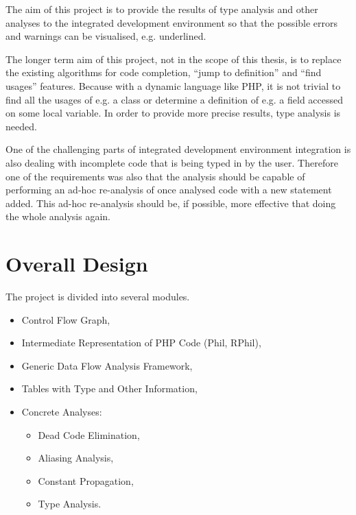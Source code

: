     The aim of this project is to provide the results of type analysis 
    and other analyses to the integrated development environment so 
    that the possible errors and warnings can be visualised, e.g. underlined.
    
    The longer term aim of this project, not in the scope of this thesis, 
    is to replace the existing algorithms for code completion, 
    ``jump to definition'' and ``find usages'' features. Because 
    with a dynamic language like PHP, it is not trivial to 
    find all the usages of e.g. a class or determine 
    a definition of e.g. a field accessed on some local variable. 
    In order to provide more precise results, 
    type analysis is needed.
    
    One of the challenging parts of integrated development 
    environment integration is also dealing with incomplete code 
    that is being typed in by the user. Therefore one of the requirements 
    was also that the analysis should be capable of 
    performing an ad-hoc re-analysis of once analysed 
    code with a new statement added. This ad-hoc re-analysis 
    should be, if possible, more effective that doing the 
    whole analysis again.
    
    \section{Overall Design}
    
    The project is divided into several modules.
    \begin{itemize}
        \item Control Flow Graph,
        \item Intermediate Representation of PHP Code (Phil, RPhil),
        \item Generic Data Flow Analysis Framework, 
        \item Tables with Type and Other Information, 
        \item Concrete Analyses:
        \begin{itemize}
            \item Dead Code Elimination, 
            \item Aliasing Analysis, 
            \item Constant Propagation,
            \item Type Analysis.
        \end{itemize}
    \end{itemize}
    
